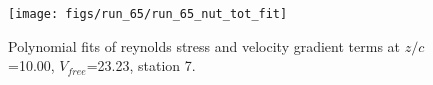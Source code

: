 \begin{figure}[H]
\centering
\texttt{[image: figs/run\_65/run\_65\_nut\_tot\_fit]}
\caption{Polynomial fits of reynolds stress and velocity gradient terms at $z/c$=10.00, $V_{free}$=23.23, station 7.}
\label{fig:run_65_nut_tot_fit}
\end{figure}


